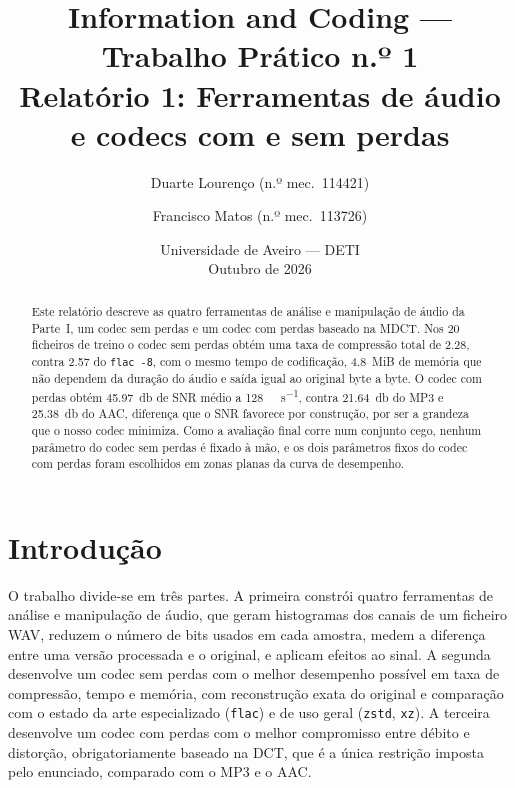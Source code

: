 \documentclass[a4paper,11pt]{article}
\title{Information and Coding --- Trabalho Prático n.º 1\\[4pt]
\large Relatório 1: Ferramentas de áudio e codecs com e sem perdas}
\author{%
  Duarte Lourenço (n.º mec.~114421) \and
  Francisco Matos (n.º mec.~113726)}
\date{Universidade de Aveiro --- DETI\\ Outubro de 2026}
\newcommand{\prog}[1]{\texttt{#1}}
\begin{document}
\setlength{\droptitle}{-2.2cm}
\maketitle
\renewcommand{\thefootnote}{}%
%
\renewcommand{\thefootnote}{\arabic{footnote}}

\begin{abstract}
Este relatório descreve as quatro ferramentas de análise e manipulação de áudio
da Parte~I, um codec sem perdas e um codec com perdas baseado na MDCT. Nos 20
ficheiros de treino o codec sem perdas obtém uma taxa de compressão total de
\num{2,28}, contra \num{2,57} do \prog{flac -8}, com o mesmo tempo de
codificação, \SI{4,8}{MiB} de memória que não dependem da duração do áudio e
saída igual ao original byte a byte. O codec com perdas obtém
\SI{45,97}{\decibel} de SNR médio a \SI{128}{\kilo\bit\per\second}, contra
\SI{21,64}{\decibel} do MP3 e \SI{25,38}{\decibel} do AAC, diferença que o SNR
favorece por construção, por ser a grandeza que o nosso codec minimiza. Como a
avaliação final corre num conjunto cego, nenhum parâmetro do codec sem perdas é
fixado à mão, e os dois parâmetros fixos do codec com perdas foram escolhidos em
zonas planas da curva de desempenho.
\end{abstract}


\section{Introdução}
\label{sec:intro}
O trabalho divide-se em três partes. A primeira constrói quatro ferramentas de
análise e manipulação de áudio, que geram histogramas dos canais de um ficheiro
WAV, reduzem o número de bits usados em cada amostra, medem a diferença entre
uma versão processada e o original, e aplicam efeitos ao sinal. A segunda
desenvolve um codec sem perdas com o melhor desempenho possível em taxa de
compressão, tempo e memória, com reconstrução exata do original e comparação com
o estado da arte especializado (\prog{flac}) e de uso geral (\prog{zstd},
\prog{xz}). A terceira desenvolve um codec com perdas com o melhor compromisso
entre débito e distorção, obrigatoriamente baseado na DCT, que é a única
restrição imposta pelo enunciado, comparado com o MP3 e o AAC.
\end{document}
